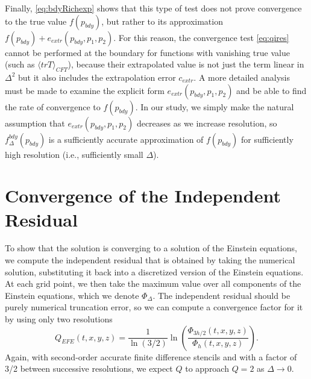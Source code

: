 \documentclass[a4paper,11pt]{article}
\numberwithin{equation}{section}
\begin{document}
Finally, \eqref{eq:bdyRichexp} shows that this type of test does not prove convergence to the true value $f(p_{bdy})$, but rather to its approximation $f(p_{bdy})+e_{extr}(p_{bdy},p_1,p_2)$. For this reason, the convergence test \eqref{eq:qires} cannot be performed at the boundary for functions with vanishing true value (such as $\langle trT \rangle_{CFT}$), because their extrapolated value is not just the term linear in $\Delta^2$ but it also includes the extrapolation error $c_{extr}$. A more detailed analysis must be made to examine the explicit form $e_{extr}(p_{bdy},p_1,p_2)$ and be able to find the rate of convergence to $f(p_{bdy})$. In our study, we simply make the natural assumption that $e_{extr}(p_{bdy},p_1,p_2)$ decreases as we increase resolution, so $f^{bdy}_{\Delta}(p_{bdy})$ is a sufficiently accurate approximation of $f(p_{bdy})$ for sufficiently high resolution (i.e., sufficiently small $\Delta$).


\section{Convergence of the Independent Residual}\label{sec:convbulk}

To show that the solution is converging to a solution of the Einstein equations, we compute the independent residual that is obtained by taking the numerical solution, substituting it back into a discretized version of the Einstein equations.
At each grid point, we then take the maximum value over all components of the Einstein equations, which we denote $\Phi_\Delta$. 
The independent residual should be purely numerical truncation error, so we can compute a convergence factor for it by using only two resolutions
\begin{equation}\label{eq:qires}
Q_{EFE}(t,x,y,z)=\frac{1}{\ln(3/2)}\ln\left( \frac{\Phi_{3h/2}(t,x,y,z)}{\Phi_{h}(t,x,y,z)} \right).
\end{equation}
Again, with second-order accurate finite difference stencils and with a factor of 3/2 between successive resolutions, we expect $Q$ to approach $Q=2$ as $\Delta\rightarrow0$.
\end{document}
